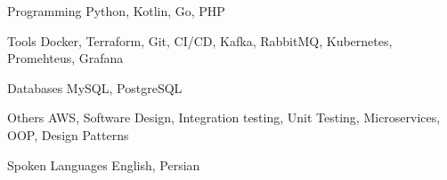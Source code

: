 


\begin{cvskills}


\cvskill
{Programming} %
{Python, Kotlin, Go, PHP} %


\cvskill
{Tools} %
{Docker, Terraform, Git, CI/CD, Kafka, RabbitMQ, Kubernetes, Promehteus, Grafana} %

\cvskill
{Databases} %
{MySQL, PostgreSQL} %

\cvskill
{Others} %
{AWS, Software Design, Integration testing, Unit Testing, Microservices, OOP, Design Patterns} %


\cvskill
{Spoken Languages} %
{English, Persian} %


\end{cvskills}